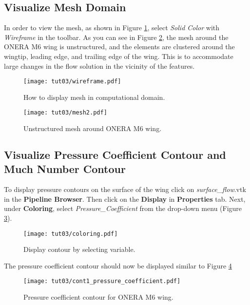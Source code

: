 \subsection{Visualize Mesh Domain}
In order to view the mesh, as shown in Figure \ref{fig3:wireframe}, select \textit{Solid Color} with \textit{Wireframe} in the toolbar. As you can see in Figure \ref{fig3:mesh}, the mesh around the ONERA M6 wing is unstructured, and the elements are clustered around the wingtip, leading edge, and trailing edge of the wing. This is to accommodate large changes in the flow solution in the vicinity of the features.
\begin{figure}[htbp]
    \centering
    \texttt{[image: tut03/wireframe.pdf]}
    \caption{How to display mesh in computational domain.}
    \label{fig3:wireframe}
\end{figure}
\begin{figure}[htbp]
    \centering
    \texttt{[image: tut03/mesh2.pdf]}
    \caption{Unstructured mesh around ONERA M6 wing.}
    \label{fig3:mesh}
\end{figure}
\subsection{Visualize Pressure Coefficient Contour and Much Number Contour}
To display pressure contours on the surface of the wing click on \textit{surface\_flow}.vtk in the \textbf{Pipeline Browser}. Then click on the \textbf{Display} in \textbf{Properties} tab. Next, under \textbf{Coloring}, select \textit{Pressure\_Coefficient} from the drop-down menu (Figure \ref{fig3:pressure_coeff_1}).
\begin{figure}[htbp]
    \centering
    \texttt{[image: tut03/coloring.pdf]}
    \caption{Display contour by selecting variable.}
    \label{fig3:pressure_coeff_1}
\end{figure}
The pressure coefficient contour should now be displayed similar to Figure \ref{fig3:plot_pressure_coeff}
\begin{figure}[htbp]
    \centering
    \texttt{[image: tut03/cont1\_pressure\_coefficient.pdf]}
    \caption{Pressure coefficient contour for ONERA M6 wing.}
    \label{fig3:plot_pressure_coeff}
\end{figure}

